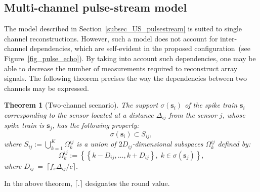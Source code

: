 \documentclass{article}
\newtheorem{theorem}{Theorem}
\newcommand{\vect}[1]{\bm{#1}}
\newcommand{\ser}[2]{#1^{#2}}
\theoremstyle{definition}
\begin{document}
\subsection{Multi-channel pulse-stream model}
\label{subsec_US_multiplechannels}
The model described in Section~\ref{subsec_US_pulsestream} is suited to single channel reconstructions. However, such a model does not account for inter-channel dependencies, which are self-evident in the proposed configuration~(see Figure~\ref{fig_pulse_echo}). By taking into account such dependencies, one may be able to decrease the number of measurements required to reconstruct array signals.
The following theorem precises the way the dependencies between two channels may be expressed.
\begin{theorem}[Two-channel scenario]
\label{th_2sens_subspace}
The support $\sigma \left(\vect{s}_i\right)$ of the spike train $\vect{s}_i$ corresponding to the sensor located at a distance $\Delta_{ij}$ from the sensor $j$, whose spike train is $\vect{s}_j$, has the following property:
	\begin{equation*}
		\sigma \left(\vect{s}_i\right) \subset S_{ij},
	\end{equation*}
	where $S_{ij} := \bigcup \limits_{k=1}^K \ser{\Omega_k}{ij}$ is a union of $2 D_{ij}$-dimensional subspaces $\ser{\Omega_k}{ij}$ defined by: 
	\begin{equation*}
		\ser{\Omega_k}{ij} := \left \lbrace \left \lbrace k - D_{ij},\dots, k+ D_{ij} \right\rbrace, \; k \in \sigma \left(\vect{s}_{j}\right) \right\rbrace,
	\end{equation*}
	where $D_{ij}~=~\lceil f_s \Delta_{ij}/ c  \rceil$. 
\end{theorem}
In the above theorem, $\lceil.\rceil$ designates the round value.
\end{document}
